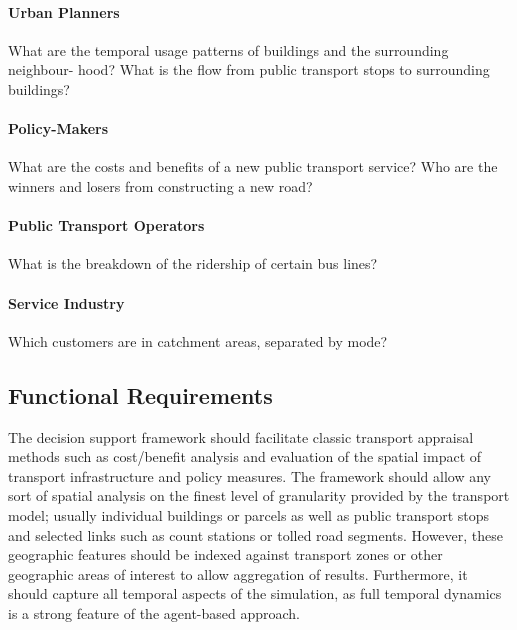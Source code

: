 \paragraph{Urban Planners}
What are the temporal usage patterns of buildings and the surrounding neighbour-
hood?
What is the flow from public transport stops to surrounding buildings?
\paragraph{Policy-Makers}
What are the costs and benefits of a new public transport service?
Who are the winners and losers from constructing a new road?
\paragraph{Public Transport Operators}
What is the breakdown of the ridership of certain bus lines?
\paragraph{Service Industry}
Which customers are in catchment areas, separated by mode?

\subsection{Functional Requirements}
The decision support framework should facilitate classic transport
appraisal methods such as cost/benefit analysis and evaluation of the spatial impact of transport
infrastructure and policy measures. The framework should allow any sort of spatial analysis on the finest level of granularity
provided by the transport model; usually individual buildings or parcels as well as public
transport stops and selected links such as count stations or tolled road segments. However, these geographic features should be indexed against transport zones or other geographic areas of interest to allow aggregation of results.
Furthermore, it should capture all temporal aspects of the simulation, as full temporal dynamics is a strong feature of the agent-based approach.


